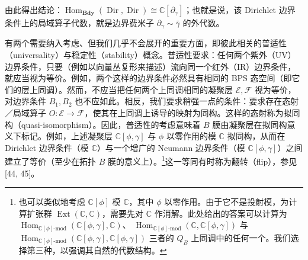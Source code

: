 

由此得出结论：$\operatorname{Hom}_{\mathbf{Bdy}}(\operatorname{Dir},\operatorname{Dir}) \cong \mathbb{C}[\partial_\gamma]$；也就是说，该 Dirichlet 边界条件上的局域算子代数，就是边界费米子 $\partial_\gamma \sim \bar\gamma$ 的外代数。

有两个需要纳入考虑、但我们几乎不会展开的重要方面，即彼此相关的普适性（universality）与稳定性（stability）概念。普适性要求：任何两个紫外（UV）边界条件，只要（例如以向量丛复形来描述）流向同一个红外（IR）边界条件，就应当视为等价。例如，两个这样的边界条件必然具有相同的 BPS 态空间（即它们的层上同调）。然而，不应当把任何两个上同调相同的凝聚层 $\mathcal{E},\mathcal{F}$ 视为等价，对边界条件 $B_1,B_2$ 也不应如此。相反，我们要求稍强一点的条件：要求存在态射／局域算子 $O:\mathcal{E}\to\mathcal{F}$，使其在上同调上诱导的映射为同构。这样的态射称为拟同构（quasi-isomorphism）。因此，普适性的考虑意味着 $B$ 膜由凝聚层在拟同构意义下标记。例如，上述凝聚层 $\mathbb{C}[\phi,\gamma]$ 与 $\phi$ 以零作用的模 $\mathbb{C}$ 拟同构，从而在 Dirichlet 边界条件（模 $\mathbb{C}$）与一个增广的 Neumann 边界条件（模 $\mathbb{C}[\phi,\gamma]$）之间建立了等价（至少在拓扑 $B$ 膜的意义上）。\footnote{也可以类似地考虑 $\mathbb{C}[\phi]$ 模 $\mathbb{C}$，其中 $\phi$ 以零作用。由于它不是投射模，为计算扩张群 $\operatorname{Ext}(\mathbb{C},\mathbb{C})$，需要先对 $\mathbb{C}$ 作消解。此处给出的答案可以计算为
$\operatorname{Hom}_{\mathbb{C}[\phi]\text{-}\mathrm{mod}}(\mathbb{C}[\phi,\gamma],\mathbb{C})$、
$\operatorname{Hom}_{\mathbb{C}[\phi]\text{-}\mathrm{mod}}(\mathbb{C},\mathbb{C}[\phi,\gamma])$ 与
$\operatorname{Hom}_{\mathbb{C}[\phi]\text{-}\mathrm{mod}}(\mathbb{C}[\phi,\gamma],\mathbb{C}[\phi,\gamma])$
三者的 $Q_B$ 上同调中的任何一个。我们选择第三种，以强调其自然的代数结构。}这一等同有时称为翻转（flip），参见 [44, 45]。

